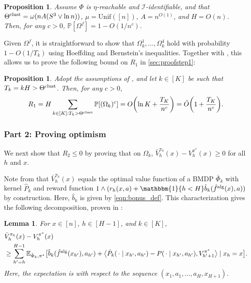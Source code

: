\documentclass[11pt]{article}
\newcommand{\mcI}{\mathcal{I}}
\newcommand{\mbbP}{\mathbb{P}}
\newcommand{\mbbE}{\mathbb{E}}
\newcommand{\clust}{\textnormal{clust}}
\newcommand{\alg}{\textnormal{alg}}
\newtheorem{lemma}[theorem]{Lemma}
\newtheorem{proposition}[theorem]{Proposition}
\theoremstyle{definition}
\theoremstyle{definition}
\begin{document}
\begin{proposition}
	\label{prop:clustering_bound_short}
	Assume $\Phi$ is $\eta$-reachable and $\mcI$-identifiable, and that $\Theta^{\clust}=\omega(nA(S^3\vee \ln n))$, $\mu=\mathrm{Unif}([n])$, $A=n^{O(1)}$, and $H=O(n)$.
	Then, for any $c>0$, $\mbbP[\Omega^f] = 1 - O(1/n^c)$.
\end{proposition}

Given $\Omega^f$, it is straightforward to show that $\Omega_k^1,\ldots,\Omega_k^4$ hold with probability $1-O(1/T_k)$ using Hoeffding and Bernstein's inequalities.
Together with , this allows us to prove the following bound on $R_1$ in \cref{sec:proofstep1}:

\begin{proposition}
	\label{prop:highprobevent}
	Adopt the assumptions of , and let $k\in[K]$ be such that $T_k=kH>\Theta^{\clust}$.
	Then, for any $c>0$,
	\begin{equation}
		R_1
		=
		H\sum_{k\in[K]:T_k>\Theta^{\clust}}\mbbP[(\Omega_k)^\mathrm{c}]
		=
		O\biggl( \ln K+ \frac{T_K}{n^c} \biggr)
		=
		\tilde{O}\biggl( 1 + \frac{T_K}{n^c} \biggr).
	\end{equation}
\end{proposition}

\subsubsection*{Part 2: Proving optimism}

We next show that $R_2\leq 0$ by proving that on $\Omega_k$, $\bar{V}^{\pi_k}_h(x)-V^{\pi^*}_h(x)\geq 0$ for all $h$ and $x$.

Note from  that $\bar{V}^{\pi_k}_h(x)$ equals the optimal value function of a \gls{BMDP} $\bar{\Phi}_k$ with kernel $\hat{P}_k$ and reward function $1\wedge (r_h(x,a)+\mathbbm{1}\{h < H\}\hat{b}_k(\hat{f}^{\alg}(x),a))$ by construction.
Here, $\hat{b}_k$ is given by \eqref{eqn:bonus_def}.
This characterization gives the following decomposition, proven in :
\begin{lemma}
	\label{lem:optimism_simulation}
	For $x\in[n]$, $h\in[H-1]$, and $k\in[K]$,
	\begin{equation}
		\label{eqn:optimism_simulation}
		\begin{split}
			& 
			\bar{V}^{\pi_k}_h(x) - V^{\pi^*}_{h}(x)
			\\
			&
			\geq
			\sum_{h'=h}^{H-1}\mbbE_{\bar{\Phi}_k,\pi^*}\bigl[
			\hat{b}_k(\hat{f}^{\alg}(x_{h'}),a_{h'})+\bigl\langle \hat{P}_k(\,\cdot\mid  x_{h'},a_{h'})-P(\,\cdot\mid  x_{h'},a_{h'}), V^{\pi^*}_{h'+1} \bigr\rangle
			\mid
			x_h = x
			\bigr]
			.
		\end{split}
	\end{equation}
	Here, the expectation is with respect to the sequence $(x_1,a_1,\ldots,a_H,x_{H+1})$.
\end{lemma}
\end{document}
